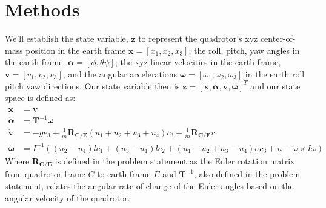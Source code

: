 \documentclass{article}
\begin{document}
\section*{Methods}
We'll establish the state variable, $\mathbf{z}$ to represent the quadrotor's xyz center-of-mass position in the earth 
frame $\mathbf{x}=[x_1, x_2, x_3]$; the roll, pitch, yaw angles in the earth frame, $\bm{\alpha}=[\phi,\theta\psi]$; the xyz linear
 velocities in the earth frame, $\mathbf{v}=[v_1, v_2, v_3]$; and the angular accelerations $\bm{\omega}=[\omega_1, \omega_2, \omega_3]$ in the earth roll pitch yaw directions. Our state variable then is $\mathbf{z}=[\mathbf{x},\bm{\alpha},\mathbf{v},\bm{\omega}]^T$ and our state space is defined as:
\begin{align}
\mathbf{\dot{x}}&=\mathbf{v} \\
\bm{\dot{\alpha}}&=\mathbf{T}^{-1}\bm{\omega} \\
\mathbf{\dot{v}}&=-ge_3+\frac{1}{m}\mathbf{R_{C/E}}(u_1+u_2+u_3+u_4)c_3+\frac{1}{m}\mathbf{R_{C/E}}r \\
\bm{\dot{\omega}}&=I^{-1}((u_2-u_4)lc_1+(u_3-u_1)lc_2+(u_1-u_2+u_3-u_4)\sigma c_3+n-\omega \times I \omega)
\end{align}
\noindent Where $\mathbf{R_{C/E}}$ is defined in the problem statement as the Euler rotation matrix from quadrotor frame $C$ to earth frame $E$ and $\mathbf{T}^{-1}$, also defined in the problem statement, relates the angular rate of change of the Euler angles based on the angular velocity of the quadrotor.
\end{document}
